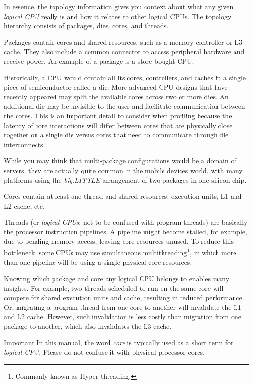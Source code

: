 \documentclass[hidelinks,titlepage,a4paper,twoside]{article}
\begin{document}
In essence, the topology information gives you context about what any given \emph{logical CPU} really is and how it relates to other logical CPUs. The topology hierarchy consists of packages, dies, cores, and threads.

Packages contain cores and shared resources, such as a memory controller or L3 cache. They also include a common connector to access peripheral hardware and receive power. An example of a package is a store-bought CPU.

Historically, a CPU would contain all its cores, controllers, and caches in a single piece of semiconductor called a die. More advanced CPU designs that have recently appeared may split the available cores across two or more dies. An additional die may be invisible to the user and facilitate communication between the cores. This is an important detail to consider when profiling because the latency of core interactions will differ between cores that are physically close together on a single die versus cores that need to communicate through die interconnects.

While you may think that multi-package configurations would be a domain of servers, they are actually quite common in the mobile devices world, with many platforms using the \emph{big.LITTLE} arrangement of two packages in one silicon chip.

Cores contain at least one thread and shared resources: execution units, L1 and L2 cache, etc.

Threads (or \emph{logical CPUs}; not to be confused with program threads) are basically the processor instruction pipelines. A pipeline might become stalled, for example, due to pending memory access, leaving core resources unused. To reduce this bottleneck, some CPUs may use simultaneous multithreading\footnote{Commonly known as Hyper-threading.}, in which more than one pipeline will be using a single physical core resources.

Knowing which package and core any logical CPU belongs to enables many insights. For example, two threads scheduled to run on the same core will compete for shared execution units and cache, resulting in reduced performance. Or, migrating a program thread from one core to another will invalidate the L1 and L2 cache. However, such invalidation is less costly than migration from one package to another, which also invalidates the L3 cache.

\begin{bclogo}[
noborder=true,
couleur=black!5,
logo=\bcbombe
]{Important}
In this manual, the word \emph{core} is typically used as a short term for \emph{logical CPU}. Please do not confuse it with physical processor cores.
\end{bclogo}
\end{document}
